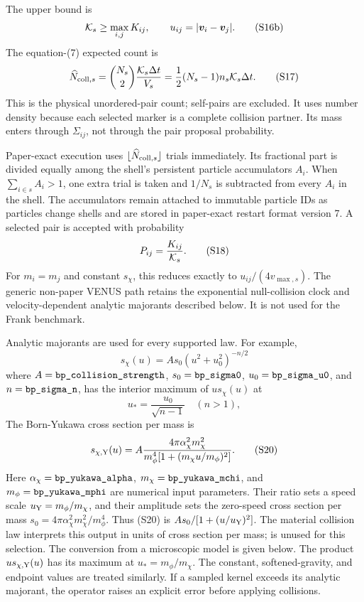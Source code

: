 The upper bound is
\[
 {\cal K}_s\geq\max_{i,j}K_{ij},
 \qquad u_{ij}=|\bm v_i-\bm v_j|.                          \tag{S16b}
\]
The equation-(7) expected count is
\[
 \widehat N_{{\rm coll},s}
 =\binom{N_s}{2}\frac{{\cal K}_s\Delta t}{V_s}
 =\frac12(N_s-1)n_s{\cal K}_s\Delta t.                     \tag{S17}
\]
This is the physical unordered-pair count; self-pairs are excluded.  It
uses number density because each selected marker is a complete collision
partner.  Its mass enters through \(\Sigma_{ij}\), not through the pair
proposal probability.

Paper-exact execution uses \(\lfloor\widehat N_{{\rm coll},s}\rfloor\)
trials immediately.  Its fractional part is divided equally among the
shell's persistent particle accumulators \(A_i\).  When
\(\sum_{i\in s}A_i>1\), one extra trial is taken and \(1/N_s\) is subtracted
from every \(A_i\) in the shell.  The accumulators remain attached to
immutable particle IDs as particles change shells and are stored in
paper-exact restart format version 7.  A selected pair is accepted with
probability
\[
 P_{ij}=
 \frac{K_{ij}}{{\cal K}_s}.                                \tag{S18}
\]
For \(m_i=m_j\) and constant \(s_\chi\), this reduces exactly to
\(u_{ij}/(4v_{\max,s})\).
The generic non-paper VENUS path retains the exponential null-collision
clock and velocity-dependent analytic majorants described below.  It is not
used for the Frank benchmark.

Analytic majorants are used for every supported law.  For example,
\[
 s_\chi(u)=A s_0(u^2+u_0^2)^{-n/2}
\]
where \(A=\code{bp_collision_strength}\), \(s_0=\code{bp_sigma0}\),
\(u_0=\code{bp_sigma_u0}\), and \(n=\code{bp_sigma_n}\),
has the interior maximum of \(u s_\chi(u)\) at
\[
 u_*=\frac{u_0}{\sqrt{n-1}}\quad(n>1),                     \tag{S19}
\]
The Born-Yukawa cross section per mass is
\[
 s_{\chi,{\rm Y}}(u)=
 A\frac{4\pi\alpha_\chi^2m_\chi^2}
 {m_\phi^4[1+(m_\chi u/m_\phi)^2]}.                        \tag{S20}
\]
Here \(\alpha_\chi=\code{bp_yukawa_alpha}\),
\(m_\chi=\code{bp_yukawa_mchi}\), and
\(m_\phi=\code{bp_yukawa_mphi}\) are numerical input parameters.  Their
ratio sets a speed scale \(u_{\rm Y}=m_\phi/m_\chi\), and their amplitude
sets the zero-speed cross section per mass
\(s_0=4\pi\alpha_\chi^2m_\chi^2/m_\phi^4\).  Thus (S20) is
\(A s_0/[1+(u/u_{\rm Y})^2]\).  The material collision law interprets
this output in units of cross section per mass;  is unused
for this selection.  The conversion from a microscopic model is given below.
The product \(u s_{\chi,{\rm Y}}(u)\) has its maximum at
\(u_*=m_\phi/m_\chi\).
The constant, softened-gravity, and endpoint values are treated similarly.
If a sampled kernel exceeds its analytic majorant, the operator raises an
explicit error before applying collisions.

